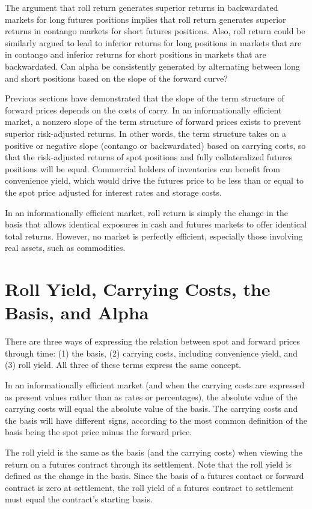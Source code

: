 \documentclass[11pt]{article}
\begin{document}
The argument that roll return generates superior returns in backwardated markets for long futures positions implies that roll return generates superior returns in contango markets for short futures positions. Also, roll return could be similarly argued to lead to inferior returns for long positions in markets that are in contango and inferior returns for short positions in markets that are backwardated. Can alpha be consistently generated by alternating between long and short positions based on the slope of the forward curve?

Previous sections have demonstrated that the slope of the term structure of forward prices depends on the costs of carry. In an informationally efficient market, a nonzero slope of the term structure of forward prices exists to prevent superior risk-adjusted returns. In other words, the term structure takes on a positive or negative slope (contango or backwardated) based on carrying costs, so that the risk-adjusted returns of spot positions and fully collateralized futures positions will be equal. Commercial holders of inventories can benefit from convenience yield, which would drive the futures price to be less than or equal to the spot price adjusted for interest rates and storage costs.

In an informationally efficient market, roll return is simply the change in the basis that allows identical exposures in cash and futures markets to offer identical total returns. However, no market is perfectly efficient, especially those involving real assets, such as commodities.

\section*{Roll Yield, Carrying Costs, the Basis, and Alpha}
There are three ways of expressing the relation between spot and forward prices through time: (1) the basis, (2) carrying costs, including convenience yield, and (3) roll yield. All three of these terms express the same concept.

In an informationally efficient market (and when the carrying costs are expressed as present values rather than as rates or percentages), the absolute value of the carrying costs will equal the absolute value of the basis. The carrying costs and the basis will have different signs, according to the most common definition of the basis being the spot price minus the forward price.

The roll yield is the same as the basis (and the carrying costs) when viewing the return on a futures contract through its settlement. Note that the roll yield is defined as the change in the basis. Since the basis of a futures contact or forward contract is zero at settlement, the roll yield of a futures contract to settlement must equal the contract's starting basis.
\end{document}
